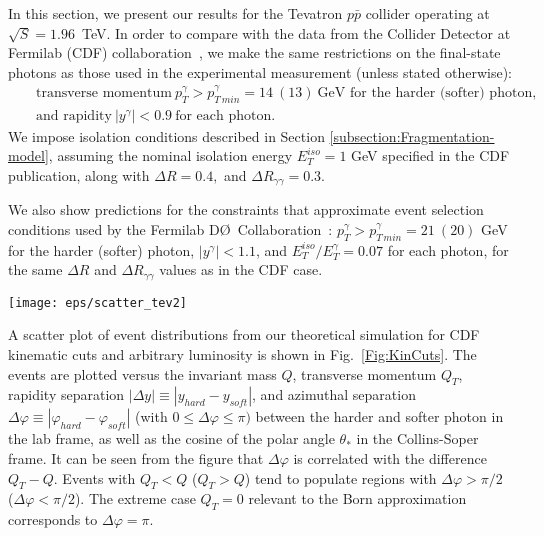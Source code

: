 \documentclass[12pt,english,aps,preprint,prd,letterpaper,fleqn,nofootinbib,showpacs,showkeys,tightenlines,floatfix]{revtex4}
\begin{document}
In this section, we present our results for the Tevatron $p\bar{p}$
collider operating at $\sqrt{S}=1.96$~TeV. In order to compare with
the data from the Collider Detector at Fermilab (CDF) collaboration~\cite{Acosta:2004sn},
we make the same restrictions on the final-state photons as those
used in the experimental measurement (unless stated otherwise): \begin{eqnarray}
 &  & {\textrm{transverse momentum}}~p_{T}^{\gamma}>p_{T\, min}^{\gamma}=14~(13)~{\textrm{GeV for the harder (softer) photon, }}\label{pTcutTev}\\
 &  & {\textrm{and rapidity}}~|y^{\gamma}|<0.9~{\textrm{for each photon}}.\end{eqnarray}
 We impose isolation conditions described in Section \ref{subsection:Fragmentation-model},
assuming the nominal isolation energy $E_{T}^{iso}=1$ GeV specified
in the CDF publication, along with $\Delta R=0.4,$ and $\Delta R_{\gamma\gamma}=0.3$.

We also show predictions for the constraints that approximate
event selection conditions used by the Fermilab 
D\O~Collaboration~\cite{Dyer:2006}:
$p_{T}^{\gamma}>p_{T\, min}^{\gamma}=21~(20)$ GeV for the harder
(softer) photon, $|y^{\gamma}|<1.1$, and $E_{T}^{iso}/E_{T}^{\gamma}=0.07$
for each photon, for the same $\Delta R$ and $\Delta R_{\gamma\gamma}$
values as in the CDF case.

\begin{figure*}
\texttt{[image: eps/scatter\_tev2]}


\caption{The diphoton event distribution from the theoretical simulation for
$\sqrt{S}=1.96$\,GeV, with the selection criteria imposed in the
CDF measurement, as a function of the various kinematic variables described
in the text, shown for $Q_T < Q$ and $Q_T > Q$ separately. \label{Fig:KinCuts}}
\end{figure*}


A scatter plot of event distributions from our theoretical simulation
for CDF kinematic cuts and arbitrary luminosity is shown in Fig.~\ref{Fig:KinCuts}.
The events are plotted versus the invariant mass $Q$, transverse
momentum $Q_{T}$, rapidity separation 
$\left|\Delta y\right|\equiv\left|y_{hard}-y_{soft}\right|$,
and azimuthal separation $\Delta\varphi\equiv\left|\varphi_{hard}-\varphi_{soft}\right|$
(with $0\leq\Delta\varphi\leq\pi)$ between the harder and softer
photon in the lab frame, as well as the cosine of the polar angle
$\theta_{*}$ in the Collins-Soper frame. It can be seen from
the figure that $\Delta\varphi$ is correlated with the difference
$Q_{T}-Q$. Events with $Q_{T}<Q$ ($Q_{T}>Q$) tend to populate regions
with $\Delta\varphi>\pi/2$ ($\Delta\varphi<\pi/2$). The extreme
case $Q_{T}=0$ relevant to the Born approximation corresponds to
$\Delta\varphi=\pi$.
\end{document}
